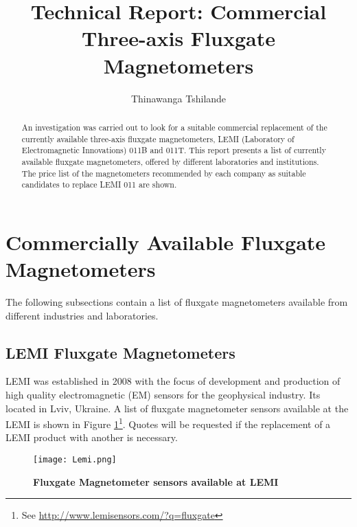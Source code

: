 \documentclass[a4paper,10pt]{report}
\title{Technical Report: Commercial Three-axis Fluxgate Magnetometers}
\author{Thinawanga Tshilande}
\begin{document}
\maketitle

\begin{abstract}
An investigation was carried out to look for a suitable commercial replacement of the
currently available three-axis fluxgate magnetometers, LEMI (Laboratory of
Electromagnetic Innovations) 011B and 011T. This report
presents a list of currently available fluxgate magnetometers, offered by different
laboratories and institutions. The price list of the magnetometers
recommended by each company as suitable candidates to replace LEMI 011 are shown. 
\end{abstract}
\section*{Commercially Available Fluxgate Magnetometers}
The following subsections contain a list of fluxgate magnetometers available from 
different industries and laboratories.
\subsection*{LEMI Fluxgate Magnetometers}
LEMI was established in 2008 with the focus of development and production of high
quality electromagnetic (EM) sensors for the geophysical industry. Its located in
Lviv, Ukraine. A list of fluxgate magnetometer sensors available at the LEMI is shown
in Figure \ref{Lemi}\footnote{See \url{http://www.lemisensors.com/?q=fluxgate}}. Quotes
will be requested if the replacement of a LEMI product with another is necessary.
\begin{figure}[!h]
\centering
\texttt{[image: Lemi.png]}
\caption{\textbf{Fluxgate Magnetometer sensors available at
LEMI}}
\label{Lemi}
\end{figure}
\end{document}

